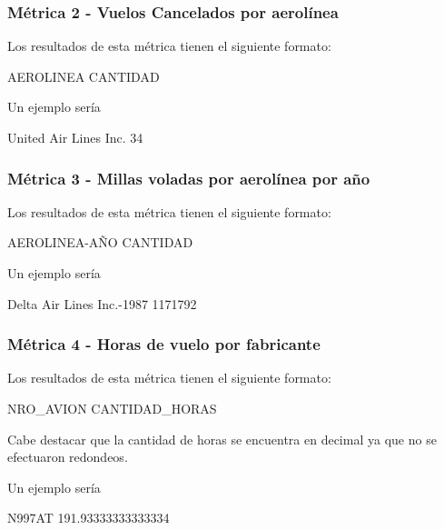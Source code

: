 \documentclass[a4paper,10pt]{article}
\begin{document}
        \subsubsection{Métrica 2 - Vuelos Cancelados por aerolínea}
            Los resultados de esta métrica tienen el siguiente formato:\\
            \begin{center}
                AEROLINEA CANTIDAD\\
            \end{center}

            Un ejemplo sería\\
            \begin{center}
               United Air Lines Inc.   34\\
            \end{center}

        \subsubsection{Métrica 3 - Millas voladas por aerolínea por año}
            Los resultados de esta métrica tienen el siguiente formato:\\
            \begin{center}
                AEROLINEA-AÑO CANTIDAD\\
            \end{center}

            Un ejemplo sería\\
            \begin{center}
               Delta Air Lines Inc.-1987   1171792\\
            \end{center}

        \subsubsection{Métrica 4 - Horas de vuelo por fabricante}
            Los resultados de esta métrica tienen el siguiente formato:\\
            \begin{center}
                NRO\_AVION CANTIDAD\_HORAS
            \end{center}
            Cabe destacar que la cantidad de horas se encuentra en decimal ya que no se efectuaron redondeos.

            Un ejemplo sería\\
            \begin{center}
                N997AT  191.93333333333334\\
            \end{center}
\end{document}
